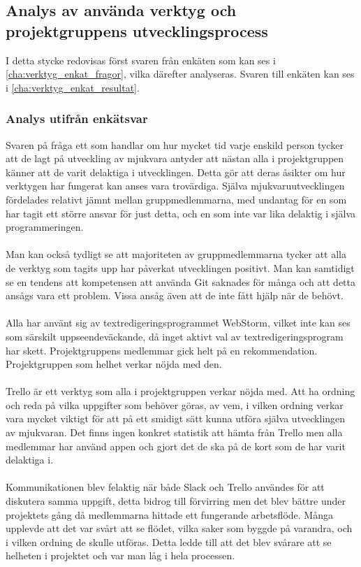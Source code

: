 \subsection{Analys av använda verktyg och projektgruppens utvecklingsprocess}
I detta stycke redovisas först svaren från enkäten som kan ses i \ref{cha:verktyg_enkat_fragor}, vilka därefter analyseras. Svaren till enkäten kan ses i \ref{cha:verktyg_enkat_resultat}.

\subsubsection{Analys utifrån enkätsvar}
Svaren på fråga ett som handlar om hur mycket tid varje enskild person tycker att de lagt på utveckling av mjukvara antyder att nästan alla i projektgruppen känner att de varit delaktiga i utvecklingen. Detta gör att deras åsikter om hur verktygen har fungerat kan anses vara trovärdiga. Själva mjukvaruutvecklingen fördelades relativt jämnt mellan gruppmedlemmarna, med undantag för en som har tagit ett större ansvar för just detta, och en som inte var lika delaktig i själva programmeringen.
\\\\
Man kan också tydligt se att majoriteten av gruppmedlemmarna tycker att alla de verktyg som tagits upp har påverkat utvecklingen positivt. Man kan samtidigt se en tendens att kompetensen att använda Git saknades för många och att detta ansågs vara ett problem. Vissa ansåg även att de inte fått hjälp när de behövt.
\\\\
Alla har använt sig av textredigeringsprogrammet WebStorm, vilket inte kan ses som särskilt uppseendeväckande, då inget aktivt val av textredigeringsprogram har skett. Projektgruppens medlemmar gick helt på en rekommendation. Projektgruppen som helhet verkar nöjda med den.
\\\\
Trello är ett verktyg som alla i projektgruppen verkar nöjda med. Att ha ordning och reda på vilka uppgifter som behöver göras, av vem, i vilken ordning verkar vara mycket viktigt för att på ett smidigt sätt kunna utföra själva utvecklingen av mjukvaran. Det finns ingen konkret statistik att hämta från Trello men alla medlemmar har använd appen och gjort det de ska på de kort som de har varit delaktiga i.
\\\\
Kommunikationen blev felaktig när både Slack och Trello användes för att diskutera samma uppgift, detta bidrog till förvirring men det blev bättre under projektets gång då medlemmarna hittade ett fungerande arbetsflöde. Många upplevde att det var svårt att se flödet, vilka saker som byggde på varandra, och i vilken ordning de skulle utföras. Detta ledde till att det blev svårare att se helheten i projektet och var man låg i hela processen. 
